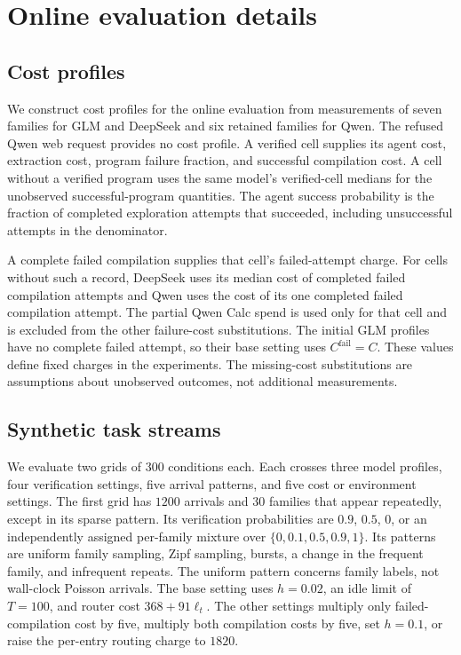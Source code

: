 \section{Online evaluation details}\label{app:simulation-details}

\subsection{Cost profiles}
\label{sec:policysim}

We construct cost profiles for the online evaluation from measurements of seven families for GLM and DeepSeek and six retained families for Qwen.
The refused Qwen web request provides no cost profile.
A verified cell supplies its agent cost, extraction cost, program failure fraction, and successful compilation cost.
A cell without a verified program uses the same model's verified-cell medians for the unobserved successful-program quantities.
The agent success probability is the fraction of completed exploration attempts that succeeded, including unsuccessful attempts in the denominator.

A complete failed compilation supplies that cell's failed-attempt charge.
For cells without such a record, DeepSeek uses its median cost of completed failed compilation attempts and Qwen uses the cost of its one completed failed compilation attempt.
The partial Qwen Calc spend is used only for that cell and is excluded from the other failure-cost substitutions.
The initial GLM profiles have no complete failed attempt, so their base setting uses $C^{\mathrm{fail}}=C$.
These values define fixed charges in the experiments.
The missing-cost substitutions are assumptions about unobserved outcomes, not additional measurements.

\subsection{Synthetic task streams}
We evaluate two grids of $300$ conditions each.
Each crosses three model profiles, four verification settings, five arrival patterns, and five cost or environment settings.
The first grid has $1200$ arrivals and $30$ families that appear repeatedly, except in its sparse pattern.
Its verification probabilities are $0.9$, $0.5$, $0$, or an independently assigned per-family mixture over $\{0,0.1,0.5,0.9,1\}$.
Its patterns are uniform family sampling, Zipf sampling, bursts, a change in the frequent family, and infrequent repeats.
The uniform pattern concerns family labels, not wall-clock Poisson arrivals.
The base setting uses $h=0.02$, an idle limit of $T=100$, and router cost $368+91\ell_t$.
The other settings multiply only failed-compilation cost by five, multiply both compilation costs by five, set $h=0.1$, or raise the per-entry routing charge to $1820$.

